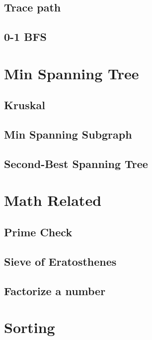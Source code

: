 	\subsection{Trace path}
	\subsection{0-1 BFS}

\section{Min Spanning Tree}
	\subsection{Kruskal}
	\subsection{Min Spanning Subgraph}
	\subsection{Second-Best Spanning Tree}
		

\section{Math Related}
	\subsection{Prime Check}
	\subsection{Sieve of Eratosthenes}
	\subsection{Factorize a number}

\section{Sorting}

